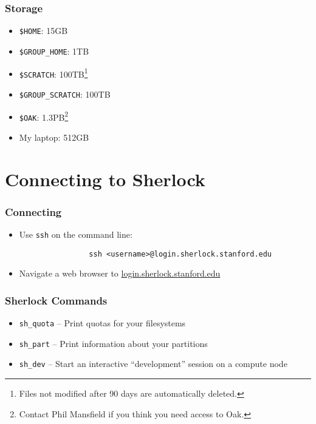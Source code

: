 \documentclass[aspectratio=169]{beamer}
\begin{document}
\begin{frame}
	\frametitle{Storage}
	\begin{itemize}
		\item \texttt{\$HOME}: 15GB
		\item \texttt{\$GROUP\_HOME}: 1TB
		\item \texttt{\$SCRATCH}: 100TB\footnote{Files not modified after 90 days are automatically deleted.}
		\item \texttt{\$GROUP\_SCRATCH}: 100TB\footnotemark[\value{footnote}]
		\item \texttt{\$OAK}: 1.3PB\footnote{Contact Phil Mansfield if you think you need access to Oak.}
		\item My laptop: 512GB
	\end{itemize}
\end{frame}


\section{Connecting to Sherlock}

\frame{\sectionpage}

\begin{frame}[fragile]
	\frametitle{Connecting}
	\begin{itemize}
		\item Use \texttt{ssh} on the command line:
			\begin{verbatim}
				ssh <username>@login.sherlock.stanford.edu
			\end{verbatim}
		\item Navigate a web browser to \url{login.sherlock.stanford.edu}
	\end{itemize}
\end{frame}

\begin{frame}
	\frametitle{Sherlock Commands}
	\begin{itemize}
		\item \texttt{sh\_quota} -- Print quotas for your filesystems
		\item \texttt{sh\_part} -- Print information about your partitions
		\item \texttt{sh\_dev} -- Start an interactive ``development'' session on a compute node
	\end{itemize}
\end{frame}

\end{document}
